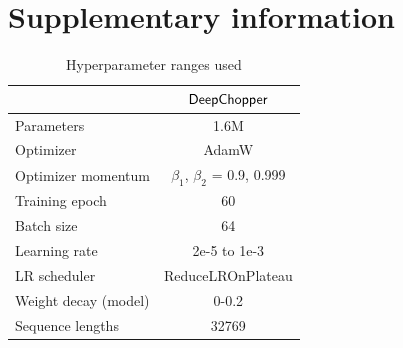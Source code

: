 \documentclass[pdflatex,sn-nature, lineno]{sn-jnl}%
\theoremstyle{thmstyleone}%
\theoremstyle{thmstyletwo}%
\theoremstyle{thmstylethree}%
\begin{document}
\newpage

\section{Supplementary information}

\renewcommand{\figurename}{Supplementary Fig.}
\renewcommand{\tablename}{Supplementary Table}




\begin{table}
	\centering
	\caption{Hyperparameter ranges used}\label{tab:hyperparameter}
	\begin{tabular}{lc}
		\toprule
		                     & {$\sf DeepChopper$}               \\
		\midrule
		Parameters           & 1.6M                              \\
		Optimizer            & AdamW                             \\
		Optimizer momentum   & $\beta_1$, $\beta_2$ = 0.9, 0.999 \\
		Training epoch       & 60                                \\
		Batch size           & 64                                \\
		Learning rate        & 2e-5 to 1e-3                      \\
		LR scheduler         & ReduceLROnPlateau                 \\
		Weight decay (model) & 0-0.2                             \\
		Sequence lengths     & 32769                             \\
		\midrule
	\end{tabular}
\end{table}

\end{document}
